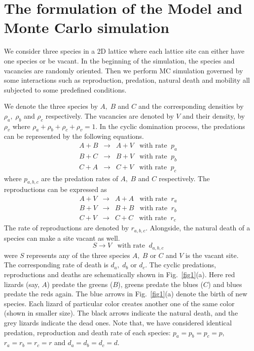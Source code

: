 \documentclass[aps, pre, twocolumn, amsmath, superscriptaddress,showkeys,showpacs]{revtex4-1}
\def\be{\begin{equation}}
\def\ee{\end{equation}}
\def\bea{\begin{eqnarray}}
\def\eea{\end{eqnarray}}
\begin{document}
	
	\section{The formulation of the Model and  Monte Carlo simulation}
	\label{simulation}
	
	\noindent
	We consider three species in a 2D lattice where each lattice site can either have one species or be vacant. In the beginning of the simulation, the species and vacancies are randomly oriented. Then we perform MC simulation {\color{red}governed by some interactions such as reproduction, predation, natural death and mobility all subjected to some predefined conditions}.
	\par {\color{red}We denote the three species by $A,\;B$ and $C$ and the corresponding densities by $\rho_a,\; \rho_b$ and $\rho_c$ respectively. The vacancies are denoted by $V$ and their density, by $\rho_v$ where $\rho_a + \rho_b + \rho_c + \rho_v = 1$. In the cyclic domination process, the predations can be represented by the following equations.}   
	\bea
	A + B & \longrightarrow & A + V \;\;\; \mbox{with rate}\;\; p_a\nonumber \\
	B + C & \longrightarrow & B + V \;\;\; \mbox{with rate}\;\; p_b\nonumber \\
	C + A & \longrightarrow & C + V \;\;\; \mbox{with rate}\;\; p_c
	\label{predation}
	\eea 
	{\color{red}where $p_{a,b,c}$ are the predation rates of $A,\;B$ and $C$ respectively. The reproductions can be expressed as}
   \bea
	A + V & \longrightarrow & A + A \;\;\; \mbox{with rate}\;\; r_a\nonumber \\
	B + V & \longrightarrow & B + B \;\;\; \mbox{with rate}\;\; r_b\nonumber \\
	C + V & \longrightarrow & C + C \;\;\; \mbox{with rate}\;\; r_c
	\label{reproduction}
	\eea
	{\color{red}The rate of reproductions are denoted by $r_{a,b,c}$. Alongside, the natural death of a species can make a site vacant as well.}
	\be
	S \longrightarrow  V \;\;\; \mbox{with rate}\;\; d_{a,b,c} 
	\label{death}
	\ee
	{\color{red}were $S$ represents any of the three species $A,\;B$ or $C$ and $V$ is the vacant site. The corresponding rate of death is $d_a,\;d_b$ or $d_c$. The cyclic predations, reproductions and deaths are schematically shown} in Fig.\ \ref{fig1}(a). Here red lizards (say, $A$) predate the greens ($B$), greens predate the blues ($C$) and blues predate the reds again. The blue arrows in Fig.\ \ref{fig1}(a) denote the birth of new species. Each lizard of  particular color creates another one of the same color (shown in smaller size). The black arrows indicate the natural death, and the grey lizards indicate the dead ones. Note that, we have considered identical predation, reproduction and death rate of each species: $p_a=p_b=p_c=p$, $r_a=r_b=r_c=r$ and $d_a=d_b=d_c=d$.	
		
\end{document}
